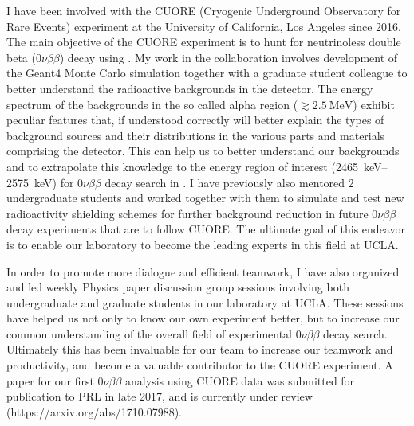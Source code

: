 \documentclass[10pt]{article} %
\begin{document}
I have been involved with the CUORE (Cryogenic Underground Observatory for Rare
Events) experiment at the University of California, Los Angeles since 2016. The
main objective of the CUORE experiment is to hunt for neutrinoless double beta
($0\nu\beta\beta$) decay using . My work in the collaboration
involves development of the Geant4 Monte Carlo simulation together with a
graduate student colleague to better understand the radioactive backgrounds in
the detector. The energy spectrum of the backgrounds in the so called alpha
region ($\gtrsim \SI{2.5}{\mega\electronvolt}$) exhibit peculiar features that,
if understood correctly will better explain the types of background sources and
their distributions in the various parts and materials comprising the detector.
This can help us to better understand our backgrounds and to extrapolate this
knowledge to the energy region of interest
(\SIrange{2465}{2575}{\kilo\electronvolt}) for $0\nu\beta\beta$ decay search in
. I have previously also mentored 2 undergraduate students and
worked together with them to simulate and test new radioactivity shielding
schemes for further background reduction in future $0\nu\beta\beta$ decay
experiments that are to follow CUORE. The ultimate goal of this endeavor is to
enable our laboratory to become the leading experts in this field at UCLA.

In order to promote more dialogue and efficient teamwork, I have also organized
and led weekly Physics paper discussion group sessions involving both
undergraduate and graduate students in our laboratory at UCLA. These sessions
have helped us not only to know our own experiment better, but to increase our
common understanding of the overall field of experimental $0\nu\beta\beta$
decay search. Ultimately this has been invaluable for our team to increase
our teamwork and productivity, and become a valuable contributor to the CUORE
experiment. A paper for our first $0\nu\beta\beta$ analysis using CUORE data
was submitted for publication to PRL in late 2017, and is currently under
review (https://arxiv.org/abs/1710.07988).

\end{document}
